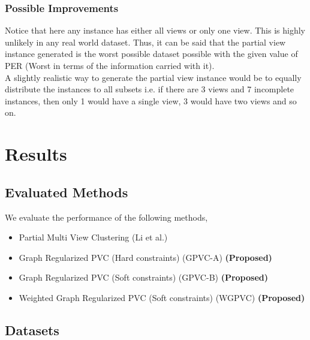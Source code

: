 \documentclass[a4paper]{article}
\begin{document}
	\subsubsection{Possible Improvements}
	
	Notice that here any instance has either all views or only one view. This is highly unlikely in any real world dataset. Thus, it can be said that the partial view instance generated is the worst possible dataset possible with the given value of PER (Worst in terms of the information carried with it).\\
	A slightly realistic way to generate the partial view instance would be to equally distribute the instances to all subsets i.e. if there are 3 views and 7 incomplete instances, then only 1 would have a single view, 3 would have two views and so on.
	
	\section{Results}

	\subsection{Evaluated Methods}
	
	We evaluate the performance of the following methods,
	\begin{itemize}
	\item {Partial Multi View Clustering (Li et al.) ~\cite{pvc15}}
	\item {Graph Regularized PVC (Hard constraints) (GPVC-A)	\small\textbf{(Proposed)}}
	\item {Graph Regularized PVC (Soft constraints) (GPVC-B)	\small\textbf{(Proposed)}}
	\item {Weighted Graph Regularized PVC (Soft constraints) (WGPVC)	\small\textbf{(Proposed)}}
	\end{itemize}

	\subsection{Datasets}
	
\end{document}
